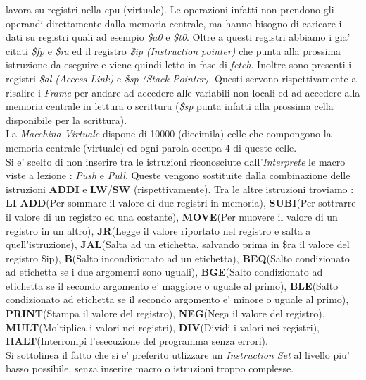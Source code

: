 \documentclass{article}
\begin{document}
\begin{enumerate}
    lavora su registri nella cpu (virtuale). Le operazioni infatti non prendono gli operandi direttamente dalla memoria centrale, ma hanno bisogno di caricare i dati su registri quali ad esempio \textit{\$a0} e \textit{\$t0}. Oltre a questi registri abbiamo i gia' citati \textit{\$fp} e \textit{\$ra} ed il registro \textit{\$ip (Instruction pointer)} che punta alla prossima istruzione da eseguire e viene quindi letto in fase di \textit{fetch}. Inoltre sono presenti i registri \textit{\$al (Access Link) } e \textit{\$sp (Stack Pointer)}. Questi servono rispettivamente a risalire i \textit{Frame} per andare ad accedere alle variabili non locali ed ad accedere alla memoria centrale in lettura o scrittura (\textit{\$sp} punta infatti alla prossima cella disponibile per la scrittura). \\
    La \textit{Macchina Virtuale} dispone di 10000 (diecimila) celle che compongono la memoria centrale (virtuale) ed ogni parola occupa 4 di queste celle.  \\
    Si e' scelto di non inserire tra le istruzioni riconosciute dall'\textit{Interprete} le macro viste a lezione : \textit{Push} e \textit{Pull}. Queste vengono sostituite dalla combinazione delle istruzioni \textbf{ADDI} e \textbf{LW}/\textbf{SW} (rispettivamente).
    Tra le altre istruzioni troviamo : \textbf{LI} 
    \textbf{ADD}(Per sommare il valore di due registri in memoria),
    \textbf{SUBI}(Per sottrarre il valore di un registro ed una costante),
    \textbf{MOVE}(Per muovere il valore di un registro in un altro),
    \textbf{JR}(Legge il valore riportato nel registro e salta a quell'istruzione),
    \textbf{JAL}(Salta ad un etichetta, salvando prima in \$ra il valore del registro \$ip),
    \textbf{B}(Salto incondizionato ad un etichetta),
    \textbf{BEQ}(Salto condizionato ad etichetta se i due argomenti sono uguali),
    \textbf{BGE}(Salto condizionato ad etichetta se il secondo argomento e' maggiore o uguale al primo),
    \textbf{BLE}(Salto condizionato ad etichetta se il secondo argomento e' minore o uguale al primo),
    \textbf{PRINT}(Stampa il valore del registro),
    \textbf{NEG}(Nega il valore del registro),
    \textbf{MULT}(Moltiplica i valori nei registri),
    \textbf{DIV}(Dividi i valori nei registri),
    \textbf{HALT}(Interrompi l'esecuzione del programma senza errori). \\
    Si sottolinea il fatto che si e' preferito utlizzare un \textit{Instruction Set} al livello piu' basso possibile, senza inserire macro o istruzioni troppo complesse.
\end{enumerate}
\end{document}
